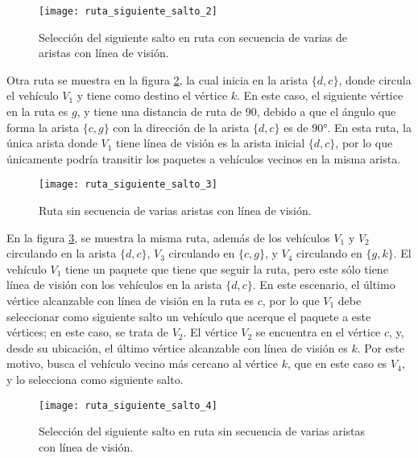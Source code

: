 \begin{figure}[th!]
\centering
\texttt{[image: ruta\_siguiente\_salto\_2]}
\decoRule
\caption[Selección del siguiente salto en ruta con secuencia de varias de
aristas con línea de visión]{Selección del siguiente salto en ruta con
secuencia de varias de aristas con línea de visión.}
\label{fig:ruta_siguiente_salto_2}
\end{figure}

Otra ruta se muestra en la figura \ref{fig:ruta_siguiente_salto_3}, la cual
inicia en la arista $\{d,c\}$, donde circula el vehículo $V_1$ y tiene como
destino el vértice $k$. En este caso, el siguiente vértice en la ruta es $g$, y
tiene una distancia de ruta de 90, debido a que el ángulo que forma la arista
$\{c,g\}$ con la dirección de la arista $\{d,c\}$ es de 90\si{\degree}. En esta ruta, la
única arista donde $V_1$ tiene línea de visión es la arista inicial $\{d,c\}$,
por lo que únicamente podría transitir los paquetes a vehículos vecinos en la
misma arista.

\begin{figure}[th!]
\centering
\texttt{[image: ruta\_siguiente\_salto\_3]}
\decoRule
\caption[Ruta sin secuencia de varias aristas con línea de visión]{Ruta sin
secuencia de varias aristas con línea de visión.}
\label{fig:ruta_siguiente_salto_3}
\end{figure}

En la figura \ref{fig:ruta_siguiente_salto_4}, se muestra la misma ruta, además
de los vehículos $V_1$ y $V_2$ circulando en la arista $\{d,c\}$, $V_3$
circulando en $\{c,g\}$, y $V_4$ circulando en $\{g,k\}$. El vehículo $V_1$
tiene un paquete que tiene que seguir la ruta, pero este sólo tiene línea de
visión con los vehículos en la arista $\{d,c\}$. En este escenario, el último
vértice alcanzable con línea de visión en la ruta es $c$, por lo que $V_1$ debe
seleccionar como siguiente salto un vehículo que acerque el paquete  a este
vértices; en este caso, se trata de $V_2$. El vértice $V_2$ se encuentra en el
vértice $c$, y, desde su ubicación, el último vértice alcanzable con línea de
visión es $k$. Por este motivo, busca el vehículo vecino más cercano al vértice
$k$, que en este caso es $V_4$, y lo selecciona como siguiente salto.

\begin{figure}[th!]
\centering
\texttt{[image: ruta\_siguiente\_salto\_4]}
\decoRule
\caption[Selección del siguiente salto en ruta sin secuencia de varias aristas
con línea de visión]{Selección del siguiente salto en ruta sin secuencia de
varias aristas con línea de visión.}
\label{fig:ruta_siguiente_salto_4}
\end{figure}

